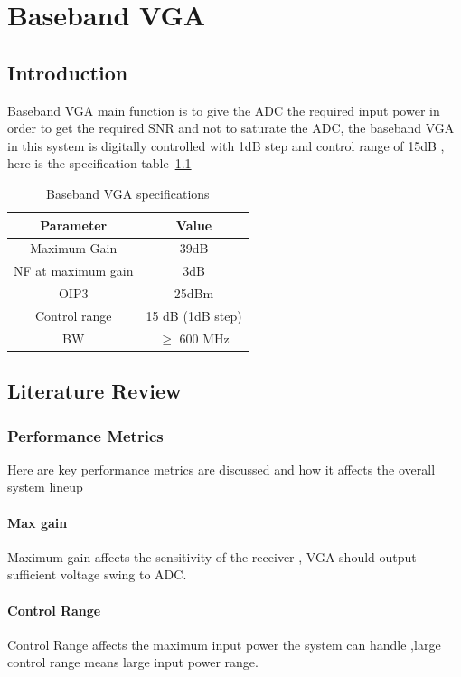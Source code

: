 \chapter{Baseband VGA}%
\label{cha:Baseband VGA}

\section{Introduction}%
\label{sec:Introduction}
Baseband VGA main function is to give the ADC the required input
power in order to get the required SNR and not to saturate the 
ADC, the baseband VGA in this system is digitally controlled 
with 1dB step and control range of 15dB , here is the specification
table~\ref{tab:VGA_specs} 
\begin{table}[htpb]
    \centering
    \caption{Baseband VGA specifications}
    \label{tab:VGA_specs}


    \begin{tabular}{|c|c|}
        \hline
        \textbf{Parameter} & \textbf{Value} \\ \hline
        Maximum Gain  & 39dB  \\ \hline
        NF at maximum gain & 3dB \\ \hline
        OIP3 & 25dBm \\ \hline
        Control range & 15 dB (1dB step) \\ \hline
        BW & $\geq$ 600 MHz \\ \hline
    \end{tabular}
\end{table}

\section{Literature Review}%
\label{sec:Literature Review}
\subsection{Performance Metrics}%
\label{sub:Performance Metrics}
Here are key performance metrics are discussed and how it affects
the overall system lineup
\subsubsection{Max gain}%
Maximum gain affects the sensitivity of the receiver , VGA should
output sufficient voltage swing to ADC.
\subsubsection{Control Range}%
\label{ssub:Control Range}
Control Range affects the maximum input power the system can handle
,large control range means large input power range.
